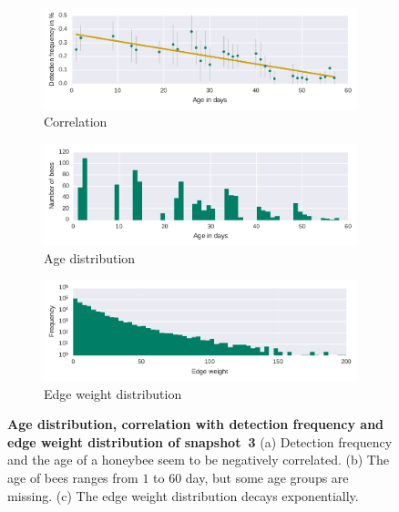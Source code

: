 \begin{figure}[bp]
	\centering
	\begin{subfigure}[b]{1\textwidth}
	\centering
	\includegraphics[width=1.0\textwidth]{Figures/n3_detFvsAge}
	\caption[Correlation]{Correlation}
	\label{fig:n3detfVSage}
	\end{subfigure} 
	\begin{subfigure}[b]{1\textwidth}
	\centering
	\includegraphics[width=1.0\textwidth]{Figures/n3_ages.pdf}
	\caption[Age distribution]{Age distribution}
	\label{fig:n3ageDist}
	\end{subfigure}
	\begin{subfigure}[b]{1\textwidth}
	\centering
	\includegraphics[width=1.0\textwidth]{Figures/n3-edgeWeightDist.pdf}
	\caption[Edge weight distribution]{Edge weight distribution}
	\label{fig:edgeWdist}
	\end{subfigure}
	\caption[Age distribution, correlation with detection frequency and edge weight distribution of snapshot~3]{\textbf{Age distribution, correlation with detection frequency and edge weight distribution of snapshot~3} (a) Detection frequency and the age of a honeybee seem to be negatively correlated. (b) The age of bees ranges from $1$ to $60$ day, but some age groups are missing. (c) The edge weight distribution decays exponentially.}
	\label{fig:ageDetF}
\end{figure}